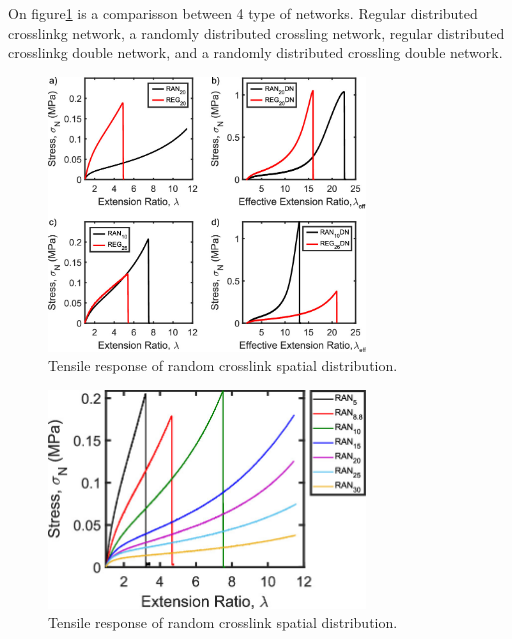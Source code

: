 On figure\ref{fig:REGRANDNcomparison} is a comparisson between 4 type of networks.
Regular distributed crosslinkg network,
a randomly distributed crossling network,
regular distributed crosslinkg double network,
and a randomly distributed crossling double network.

\begin{figure}[ht!]
    \centering
    \includegraphics[width=0.75\textwidth]{figs/explainMechResponse/comparissonREGRANDN.jpeg}
    \caption{Tensile response of random crosslink spatial distribution\citep{kongEffectCrossLinkHomogeneity2024}.}\label{fig:REGRANDNcomparison}
\end{figure}



\begin{figure}[ht!]
    \centering
    \includegraphics[width=0.75\textwidth]{figs/explainMechResponse/singleRANtensile.jpeg}
    \caption{Tensile response of random crosslink spatial distribution\citep{kongEffectCrossLinkHomogeneity2024}.}
\end{figure}

